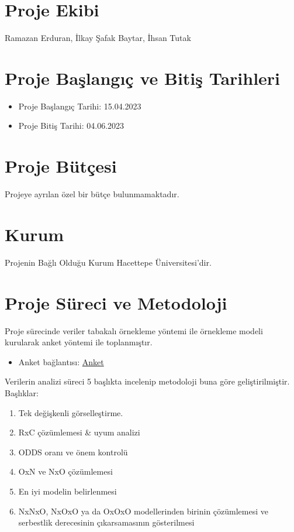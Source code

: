 \documentclass{article}
\begin{document}
\section{Proje Ekibi}
Ramazan Erduran, İlkay Şafak Baytar, İhsan Tutak

\section{Proje Başlangıç ve Bitiş Tarihleri}
\begin{itemize}
    \item Proje Başlangıç Tarihi: 15.04.2023
    \item Proje Bitiş Tarihi: 04.06.2023 
\end{itemize}

\section{Proje Bütçesi}
Projeye ayrılan özel bir bütçe bulunmamaktadır.

\section{Kurum}
Projenin Bağlı Olduğu Kurum Hacettepe Üniversitesi'dir.

\section{Proje Süreci ve Metodoloji}
Proje sürecinde veriler tabakalı örnekleme yöntemi ile örnekleme modeli kurularak anket yöntemi ile toplanmıştır.
\begin{itemize}
    \item Anket bağlantısı: \href{https://docs.google.com/forms/d/e/1FAIpQLSf7CBA1tg89lFSdAl9VRSa4vjmv8COCJtRDvQmYa0n0l72JUA/viewform?usp=sf_link}{Anket}
\end{itemize}
Verilerin analizi süreci 5 başlıkta incelenip metodoloji buna göre geliştirilmiştir. Başlıklar:
\begin{enumerate}
    \item Tek değişkenli görselleştirme.
    \item RxC çözümlemesi & uyum analizi
    \item ODDS oranı ve önem kontrolü
    \item OxN ve NxO çözümlemesi
    \item En iyi modelin belirlenmesi
    \item NxNxO, NxOxO ya da OxOxO modellerinden birinin çözümlemesi ve serbestlik derecesinin çıkarsamasının gösterilmesi
\end{enumerate}
\end{document}
